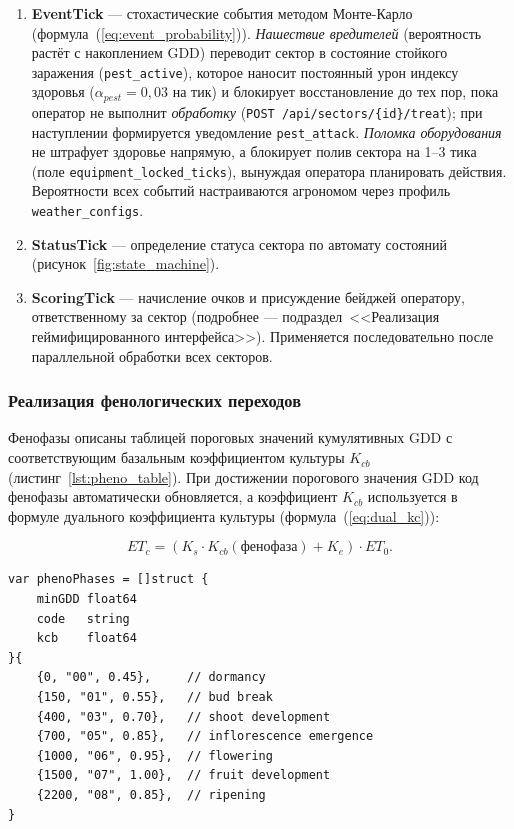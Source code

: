 \begin{enumerate}
    $H$ по формуле~(\ref{eq:health_index}).
    \item \textbf{EventTick} --- стохастические события
    методом Монте-Карло
    (формула~(\ref{eq:event_probability})). \emph{Нашествие
    вредителей} (вероятность растёт с накоплением GDD)
    переводит сектор в состояние стойкого заражения
    (\texttt{pest\_active}), которое наносит постоянный урон
    индексу здоровья ($\alpha_{pest} = 0{,}03$ на тик) и
    блокирует восстановление до тех пор, пока оператор не
    выполнит \emph{обработку} (\texttt{POST /api/sectors/\{id\}/treat});
    при наступлении формируется уведомление \texttt{pest\_attack}.
    \emph{Поломка оборудования} не штрафует здоровье напрямую,
    а блокирует полив сектора на 1--3 тика (поле
    \texttt{equipment\_locked\_ticks}), вынуждая оператора
    планировать действия. Вероятности всех событий настраиваются
    агрономом через профиль \texttt{weather\_configs}.
    \item \textbf{StatusTick} --- определение статуса
    сектора по автомату состояний
    (рисунок~\ref{fig:state_machine}).
    \item \textbf{ScoringTick} --- начисление очков и
    присуждение бейджей оператору, ответственному за сектор
    (подробнее --- подраздел~<<Реализация геймифицированного
    интерфейса>>). Применяется последовательно после
    параллельной обработки всех секторов.
\end{enumerate}

\subsubsection{Реализация фенологических переходов}

Фенофазы описаны таблицей пороговых значений кумулятивных
GDD с соответствующим базальным коэффициентом культуры
$K_{cb}$ (листинг~\ref{lst:pheno_table}). При достижении
порогового значения GDD код фенофазы автоматически
обновляется, а коэффициент $K_{cb}$ используется в формуле
дуального коэффициента культуры
(формула~(\ref{eq:dual_kc})):

\begin{equation}
    ET_c = (K_s \cdot K_{cb}(\text{фенофаза}) + K_e) \cdot ET_0.
    \label{eq:etc_impl}
\end{equation}

\begin{lstlisting}[caption={Таблица фенологических порогов (engine.go)}, label={lst:pheno_table}]
var phenoPhases = []struct {
    minGDD float64
    code   string
    kcb    float64
}{
    {0, "00", 0.45},     // dormancy
    {150, "01", 0.55},   // bud break
    {400, "03", 0.70},   // shoot development
    {700, "05", 0.85},   // inflorescence emergence
    {1000, "06", 0.95},  // flowering
    {1500, "07", 1.00},  // fruit development
    {2200, "08", 0.85},  // ripening
}
\end{lstlisting}

